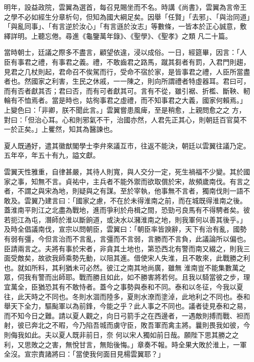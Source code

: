 \begin{pinyinscope}
 明年，設益政院，雲翼為選首，每召見賜坐而不名。時講《尚書》，雲翼為言帝王之學不必如經生分章析句，但知為國大綱足矣。因舉「任賢」「去邪」、「與治同道」「與亂同事」、「有言逆於汝心」「有言遜於汝志」等數條，一皆本於正心誠意，敷繹詳明。上聽忘倦。尋進《龜鑒萬年錄》、《聖學》、《聖孝》之類
 凡二十篇。



 當時朝士，廷議之際多不盡言，顧望依違，浸以成俗。一日，經筵畢，因言：「人臣有事君之禮，有事君之義。禮，不敢齒君之路馬，蹴其芻者有罰，入君門則趨，見君之几杖則起，君命召不俟駕而行，受命不宿於家，是皆事君之禮，人臣所當盡者也。然國家之利害，生民之休戚，一一陳之，則向所謂禮者特虛器耳。君曰可，而有否者獻其否；君曰否，而有可者獻其可。言有不從，雖引裾、折檻、斷鞅、軔輪有不恤焉者。當是時也，姑徇事君之虛禮，而不知事君之大義，國家何賴焉。」上變色曰：「非卿，朕不聞此言。」雲翼嘗患風痺，至是稍愈，上親問愈之之
 方，對曰：「但治心耳。心和則邪氣不干，治國亦然，人君先正其心，則朝廷百官莫不一於正矣。」上矍然，知其為醫諫也。



 夏人既通好，遣其徽猷閣學士李弁來議互市，往返不能決，朝廷以雲翼往議乃定。五年卒，年五十有九，謚文獻。



 雲翼天性雅重，自律甚嚴，其待人則寬，與人交分一定，死生禍福不少變。其於國家之事，知無不言。貞祐中，主兵者不能外禦而欲取償於宋，故頻歲南伐。有言之者，不謂之與宋為地，則疑與之有謀。至於宰執，他事無不言者，獨南伐則一語不敢及。雲翼乃建言曰：「國家之慮，不在於未得淮南之前，而在城既得淮南之後。
 蓋淮南平則江之北盡為戰地，進而爭利於舟楫之間，恐勁弓良馬有不得騁者矣。彼若扼江為屯，潛師於淮以斷餉道，或決水以瀦淮南之地，則我軍何以善其後乎。」及時全倡議南伐，宣宗以問朝臣，雲翼曰：「朝臣率皆諛辭，天下有治有亂，國勢有弱有彊，今但言治而不言亂，言彊而不言弱，言勝而不言負，此議論所以偏也。臣請兩言之。夫將有事於宋者，非貪其土地也，第恐西北有警而南又綴之，則我三面受敵矣，故欲我師乘勢先動，以阻其進。借使宋人失淮，且不敢來，此戰勝之利也。就如所料，其利猶未可必然。彼江之南其地尚廣，雖無
 淮南豈不能集數萬之眾，伺我有警而出師耶。戰而勝且如此，如不勝害將若何。且我以騎當彼之步，理宜萬全，臣猶恐其有不敢恃者。蓋今之事勢與泰和不同。泰和以冬征，今我以夏往，此天時之不同也。冬則水涸而陸多，夏則水潦而塗淖，此地利之不同也。泰和舉天下全力，驅颭軍以為前鋒，今能之乎？此人事之不同也。議者徒見泰和之易，而不知今日之難。請以夏人觀之，向日弓箭手之在西邊者，一遇敵則搏而戰、袒而射，彼已奔北之不暇，今乃陷吾城而虜守臣，敗吾軍而禽主將。曩則畏我如彼，今則侮我如此。夫以夏人既非前日，奈
 何以宋人獨如前日哉。願陛下思其勝之之利，又思敗之之害，無悅甘言，無貽後悔。」章奏不報。時全果大敗於淮上，一軍全沒。宣宗責諸將曰：「當使我何面目見楊雲翼耶？」




\end{pinyinscope}
